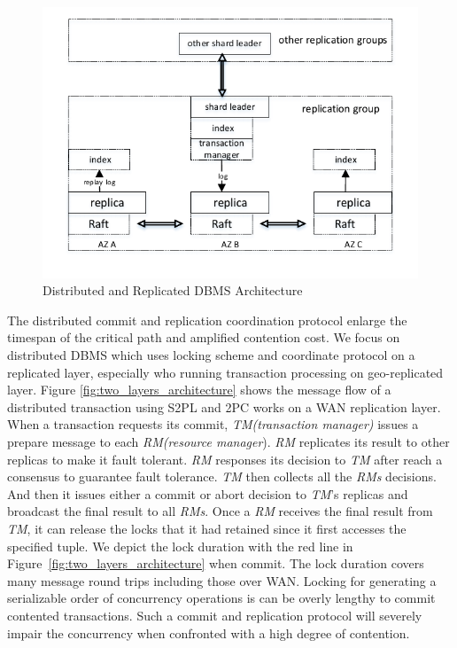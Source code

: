 \documentclass[conference]{IEEEtran}
\begin{document}
\begin{figure}[htbp]
  \centerline{\includegraphics[scale=0.8]{figure/architecture.pdf}}
  \caption{Distributed and Replicated DBMS Architecture}
  \label{fig:architecture}
\end{figure}

The distributed commit and replication coordination protocol enlarge the timespan of the critical path and amplified contention cost.
We focus on distributed DBMS which uses locking scheme and coordinate protocol on a replicated layer, especially who running transaction processing on geo-replicated layer.
Figure \ref{fig:two_layers_architecture} shows the message flow of a distributed transaction using S2PL and 2PC works on a WAN replication layer.
When a transaction requests its commit, \emph{TM(transaction manager)}  issues a prepare message to each \emph{RM(resource manager}).
\emph{RM} replicates its result to other replicas to make it fault tolerant.
\emph{RM} responses its decision to \emph{TM} after reach a consensus to guarantee fault tolerance. 
\emph{TM} then collects all the \emph{RMs} decisions.
And then it issues either a commit or abort decision to \emph{TM}'s replicas and
broadcast the final result to all \emph{RMs}.
Once a \emph{RM} receives the final result from \emph{TM}, it can release the locks that it had retained since it first accesses the specified tuple.
We depict the lock duration with the red line in Figure~\ref{fig:two_layers_architecture} when commit.
The lock duration covers many message round trips including those over WAN.
Locking for generating a serializable order of concurrency operations is can be overly lengthy to commit contented transactions. 
Such a commit and replication protocol will severely impair the concurrency when confronted with a high degree of contention.
\end{document}
